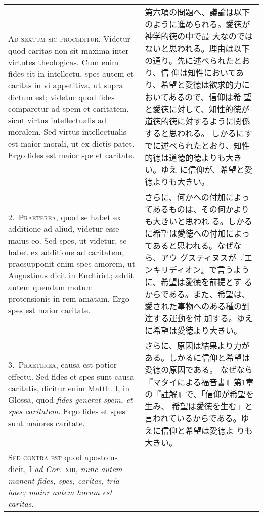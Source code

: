 \documentclass[10pt]{jsarticle}
\begin{document}
\begin{longtable}{p{21em}p{21em}}
{\scshape Ad sextum sic proceditur}. Videtur quod caritas non sit
maxima inter virtutes theologicas. Cum enim fides sit in intellectu,
spes autem et caritas in vi appetitiva, ut supra dictum est; videtur
quod fides comparetur ad spem et caritatem, sicut virtus
intellectualis ad moralem. Sed virtus intellectualis est maior morali,
ut ex dictis patet. Ergo fides est maior spe et caritate.

&
 
 第六項の問題へ、議論は以下のように進められる。愛徳が神学的徳の中で最
 大なのではないと思われる。理由は以下の通り。先に述べられたとおり、信
 仰は知性においてあり、希望と愛徳は欲求的力においてあるので、信仰は希
 望と愛徳に対して、知性的徳が道徳的徳に対するように関係すると思われる。
 しかるにすでに述べられたとおり、知性的徳は道徳的徳よりも大きい。ゆえ
 に信仰が、希望と愛徳よりも大きい。

\\


2.~{\scshape Praeterea}, quod se habet ex additione ad aliud, videtur
esse maius eo. Sed spes, ut videtur, se habet ex additione ad
caritatem, praesupponit enim spes amorem, ut Augustinus dicit in
Enchirid.; addit autem quendam motum protensionis in rem amatam. Ergo
spes est maior caritate.

&

 さらに、何かへの付加によってあるものは、その何かよりも大きいと思われ
 る。しかるに希望は愛徳への付加によってあると思われる。なぜなら、アウ
 グスティヌスが『エンキリディオン』で言うように、希望は愛徳を前提とす
 るからである。また、希望は、愛された事物へのある種の到達する運動を付
 加する。ゆえに希望は愛徳より大きい。

\\

3.~{\scshape Praeterea}, causa est potior effectu. Sed fides et spes
sunt causa caritatis, dicitur enim Matth. I, in Glossa, quod {\itshape
fides generat spem, et spes caritatem}. Ergo fides et spes sunt
maiores caritate.

 &

 さらに、原因は結果より力がある。しかるに信仰と希望は愛徳の原因である。
 なぜなら『マタイによる福音書』第1章の『註解』で、「信仰が希望を生み、
 希望は愛徳を生む」と言われているからである。ゆえに信仰と希望は愛徳よ
 りも大きい。

 \\


{\scshape Sed contra est} quod apostolus dicit, I {\itshape ad
Cor}.~{\scshape xiii}, {\itshape nunc autem manent fides, spes,
caritas, tria haec; maior autem horum est caritas}.



\end{longtable}
\end{document}

